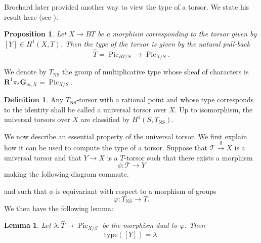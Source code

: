 \documentclass{proc-l}
\newcommand{\R}{\mathbf{R}}
\newcommand{\G}{\mathbf{G}}
\DeclareMathOperator{\Pic}{Pic}
\DeclareMathOperator{\NS}{NS}
\newcommand{\stackT}{\mathcal{T}}
\newtheorem{lemma}[theorem]{Lemma}
\newtheorem{prop}[theorem]{Proposition}
\theoremstyle{definition}
\newtheorem{definition}[theorem]{Definition}
\theoremstyle{remark}
\numberwithin{equation}{section}
\begin{document}
Brochard later provided another way to view the type of a torsor. We state his result here (see \cite[Proposition 9.3 (ii) and its proof]{Brochard2021}):

\begin{prop}\label{proposition_computation_type_torseur}
Let $X \rightarrow BT$ be a morphism corresponding to the torsor given by $[Y] \in H^1(X,T)$. Then the type of the torsor is given by the natural pull-back
$$\widehat{T} = \Pic_{BT/S} \rightarrow \Pic_{X/S}.$$
\end{prop}


We denote by $T_{\NS}$ the group of multiplicative type whose sheaf of characters is $\R^1 \pi_* \G_{m,X} = \Pic_{X/S}$.

\begin{definition}
    Any $T_{\NS}$-torsor with a rational point and whose type corresponds to the identity shall be called a universal torsor over $X$. Up to isomorphism, the universal torsors over $X$ are classified by $H^1(S,T_{\NS})$.
\end{definition}

We now describe an essential property of the universal torsor. We first explain how it can be used to compute the type of a torsor. Suppose that $\stackT \xrightarrow{q} X$ is a universal torsor and that $Y \rightarrow X$ is a $T$-torsor such that there exists a morphism
$$\phi : \stackT \rightarrow Y$$
making the following diagram commute.
\begin{center}
\end{center}
and such that $\phi$ is equivariant with respect to a morphism of groups
$$\varphi : T_{\NS} \rightarrow T.$$
We then have the following lemma:

\begin{lemma}\label{lemma_computation_type_morphism}
Let $\lambda : \widehat{T} \rightarrow \Pic_{X/S}$ be the morphism dual to $\varphi$. Then
$$\mathrm{type}([Y]) = \lambda.$$
\end{lemma}
\end{document}
